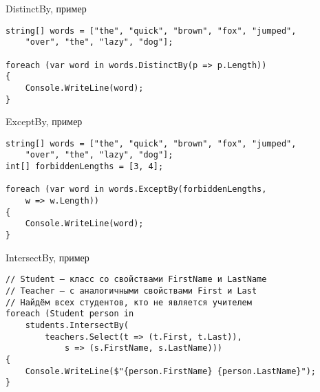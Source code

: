 \documentclass{../../slides-style}
\begin{document}
    \begin{frame}[fragile]{DistinctBy, пример}
        \begin{verbatim}
string[] words = ["the", "quick", "brown", "fox", "jumped", 
    "over", "the", "lazy", "dog"];

foreach (var word in words.DistinctBy(p => p.Length))
{
    Console.WriteLine(word);
}
        \end{verbatim}
    \end{frame}

    \begin{frame}[fragile]{ExceptBy, пример}
        \begin{verbatim}
string[] words = ["the", "quick", "brown", "fox", "jumped", 
    "over", "the", "lazy", "dog"];
int[] forbiddenLengths = [3, 4];

foreach (var word in words.ExceptBy(forbiddenLengths, 
    w => w.Length))
{
    Console.WriteLine(word);
}
        \end{verbatim}
    \end{frame}

    \begin{frame}[fragile]{IntersectBy, пример}
        \begin{verbatim}
// Student — класс со свойствами FirstName и LastName
// Teacher — с аналогичными свойствами First и Last
// Найдём всех студентов, кто не является учителем
foreach (Student person in
    students.IntersectBy(
        teachers.Select(t => (t.First, t.Last)), 
            s => (s.FirstName, s.LastName)))
{
    Console.WriteLine($"{person.FirstName} {person.LastName}");
}
        \end{verbatim}
    \end{frame}
\end{document}

